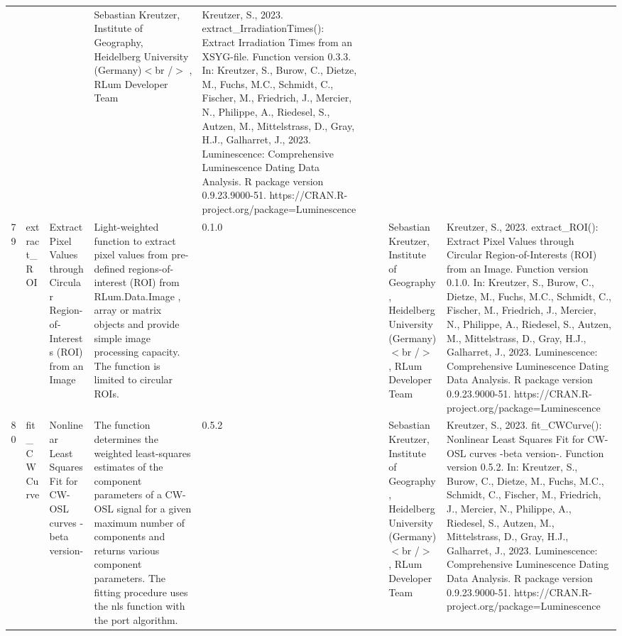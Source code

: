 \begin{table}[ht]
\begin{tabular}{rllllllll}
 &  &  & Sebastian Kreutzer, Institute of Geography, Heidelberg University (Germany)$<$br /$>$ , RLum Developer Team & Kreutzer, S., 2023. extract\_IrradiationTimes(): Extract Irradiation Times from an XSYG-file. Function version 0.3.3. In: Kreutzer, S., Burow, C., Dietze, M., Fuchs, M.C., Schmidt, C., Fischer, M., Friedrich, J., Mercier, N., Philippe, A., Riedesel, S., Autzen, M., Mittelstrass, D., Gray, H.J., Galharret, J., 2023. Luminescence: Comprehensive Luminescence Dating Data Analysis. R package version 0.9.23.9000-51. https://CRAN.R-project.org/package=Luminescence
 \\ 
  79 & extract\_ROI & Extract Pixel Values through Circular Region-of-Interests (ROI) from an Image & Light-weighted function to extract pixel values from pre-defined regions-of-interest (ROI) from RLum.Data.Image ,  array  or  matrix  objects and provide simple image processing capacity. The function is limited to circular ROIs. & 0.1.0
 &  &  & Sebastian Kreutzer, Institute of Geography, Heidelberg University (Germany)$<$br /$>$ , RLum Developer Team & Kreutzer, S., 2023. extract\_ROI(): Extract Pixel Values through Circular Region-of-Interests (ROI) from an Image. Function version 0.1.0. In: Kreutzer, S., Burow, C., Dietze, M., Fuchs, M.C., Schmidt, C., Fischer, M., Friedrich, J., Mercier, N., Philippe, A., Riedesel, S., Autzen, M., Mittelstrass, D., Gray, H.J., Galharret, J., 2023. Luminescence: Comprehensive Luminescence Dating Data Analysis. R package version 0.9.23.9000-51. https://CRAN.R-project.org/package=Luminescence
 \\ 
  80 & fit\_CWCurve & Nonlinear Least Squares Fit for CW-OSL curves -beta version- & The function determines the weighted least-squares estimates of the component parameters of a CW-OSL signal for a given maximum number of components and returns various component parameters. The fitting procedure uses the  nls  function with the  port  algorithm. & 0.5.2
 &  &  & Sebastian Kreutzer, Institute of Geography, Heidelberg University (Germany)$<$br /$>$ , RLum Developer Team & Kreutzer, S., 2023. fit\_CWCurve(): Nonlinear Least Squares Fit for CW-OSL curves -beta version-. Function version 0.5.2. In: Kreutzer, S., Burow, C., Dietze, M., Fuchs, M.C., Schmidt, C., Fischer, M., Friedrich, J., Mercier, N., Philippe, A., Riedesel, S., Autzen, M., Mittelstrass, D., Gray, H.J., Galharret, J., 2023. Luminescence: Comprehensive Luminescence Dating Data Analysis. R package version 0.9.23.9000-51. https://CRAN.R-project.org/package=Luminescence
 \\ 

\end{tabular}
\end{table}
